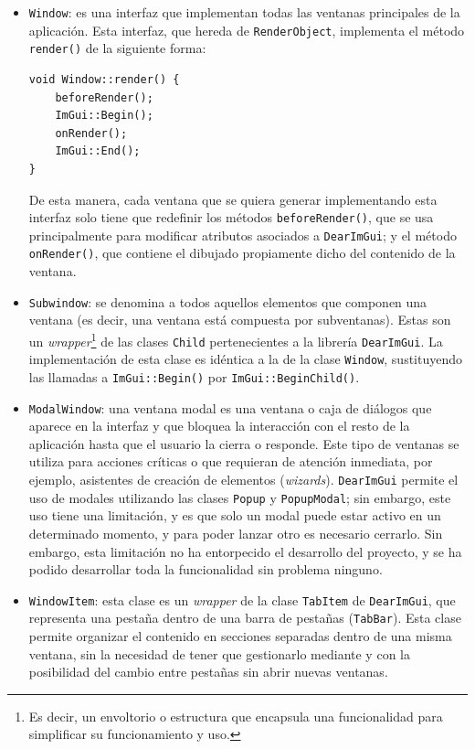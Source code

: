\begin{itemize}
	\item \texttt{Window}: es una interfaz que implementan todas las ventanas principales de la aplicación. Esta interfaz, que hereda de \texttt{RenderObject}, implementa el método \texttt{render()} de la siguiente forma:
\begin{center}
	\begin{minipage}{0.6\textwidth}
		\begin{verbatim}
void Window::render() {
	beforeRender();
	ImGui::Begin();
	onRender();
	ImGui::End();
}
		\end{verbatim}
	\end{minipage}
\end{center}
	De esta manera, cada ventana que se quiera generar implementando esta interfaz solo tiene que redefinir los métodos \texttt{beforeRender()}, que se usa principalmente para modificar atributos asociados a \texttt{DearImGui}; y el método \texttt{onRender()}, que contiene el dibujado propiamente dicho del contenido de la ventana.
	\item \texttt{Subwindow}: se denomina  a todos aquellos elementos que componen una ventana (es decir, una ventana está compuesta por subventanas). Estas  son un \textit{wrapper}\footnote{Es decir, un envoltorio o estructura que encapsula una funcionalidad para simplificar su funcionamiento y uso.} de las clases \texttt{Child} pertenecientes a la librería \texttt{DearImGui}. La implementación de esta clase es idéntica a la de la clase \texttt{Window}, sustituyendo las llamadas a \texttt{ImGui::Begin()} por \texttt{ImGui::BeginChild()}.
	\item \texttt{ModalWindow}: una ventana modal es una ventana o caja de diálogos que aparece en la interfaz y que bloquea la interacción con el resto de la aplicación hasta que el usuario la cierra o responde. Este tipo de ventanas se utiliza para acciones críticas o que requieran de atención inmediata, por ejemplo, asistentes de creación de elementos (\textit{wizards}). \texttt{DearImGui} permite el uso de modales utilizando las clases \texttt{Popup} y \texttt{PopupModal}; sin embargo, este uso tiene una limitación, y es que solo un modal puede estar activo en un determinado momento, y para poder lanzar otro es necesario cerrarlo. Sin embargo, esta limitación no ha entorpecido el desarrollo del proyecto, y se ha podido desarrollar toda la funcionalidad sin problema ninguno.
	\item \texttt{WindowItem}: esta clase es un \textit{wrapper} de la clase \texttt{TabItem} de \texttt{DearImGui}, que representa una pestaña dentro de una barra de pestañas (\texttt{TabBar}). Esta clase permite organizar el contenido en secciones separadas dentro de una misma ventana, sin la necesidad de tener que gestionarlo mediante  y con la posibilidad del cambio entre pestañas sin abrir nuevas ventanas.
\end{itemize}

